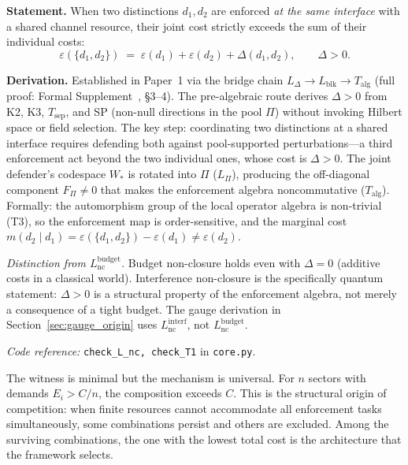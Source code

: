 \documentclass[11pt]{article}
\newcommand{\coderef}[2]{\smallskip\noindent\textit{Code reference:} \texttt{#1} in \texttt{#2}.}
\begin{document}
\begin{tcolorbox}[apfbox, title={Lemma $L_{\mathrm{nc}}^{\mathrm{interf}}$ (Interference Non-Closure)}]
\textbf{Statement.}  When two distinctions $d_1, d_2$ are enforced \emph{at the same interface} with a shared channel resource, their joint cost strictly exceeds the sum of their individual costs:
\begin{equation}
\varepsilon(\{d_1, d_2\}) \;=\; \varepsilon(d_1) + \varepsilon(d_2) + \Delta(d_1, d_2), \qquad \Delta > 0.
\label{eq:superadditivity}
\end{equation}

\smallskip\noindent\textbf{Derivation.}  Established in Paper~1 via the bridge chain $L_\Delta \to L_{\mathrm{blk}} \to T_{\mathrm{alg}}$ (full proof: Formal Supplement~\cite{BrookeSupplement}, \S3--4).  The pre-algebraic route derives $\Delta > 0$ from K2, K3, $T_{\mathrm{sep}}$, and SP (non-null directions in the pool $\Pi$) without invoking Hilbert space or field selection.  The key step: coordinating two distinctions at a shared interface requires defending both against pool-supported perturbations---a third enforcement act beyond the two individual ones, whose cost is $\Delta > 0$.  The joint defender's codespace $W_*$ is rotated into $\Pi$ ($L_\Pi$), producing the off-diagonal component $F_\Pi \ne 0$ that makes the enforcement algebra noncommutative ($T_{\mathrm{alg}}$).  Formally: the automorphism group of the local operator algebra is non-trivial (T3), so the enforcement map is order-sensitive, and the marginal cost $m(d_2 \mid d_1) = \varepsilon(\{d_1,d_2\}) - \varepsilon(d_1) \ne \varepsilon(d_2)$.

\smallskip\noindent\textit{Distinction from $L_{\mathrm{nc}}^{\mathrm{budget}}$.}  Budget non-closure holds even with $\Delta = 0$ (additive costs in a classical world).  Interference non-closure is the specifically quantum statement: $\Delta > 0$ is a structural property of the enforcement algebra, not merely a consequence of a tight budget.  The gauge derivation in Section~\ref{sec:gauge_origin} uses $L_{\mathrm{nc}}^{\mathrm{interf}}$, not $L_{\mathrm{nc}}^{\mathrm{budget}}$.

\coderef{check\_L\_nc, check\_T1}{core.py}
\end{tcolorbox}

The witness is minimal but the mechanism is universal.  For $n$ sectors with demands $E_i > C/n$, the composition exceeds $C$.  This is the structural origin of competition: when finite resources cannot accommodate all enforcement tasks simultaneously, some combinations persist and others are excluded.  Among the surviving combinations, the one with the lowest total cost is the architecture that the framework selects.
\end{document}

